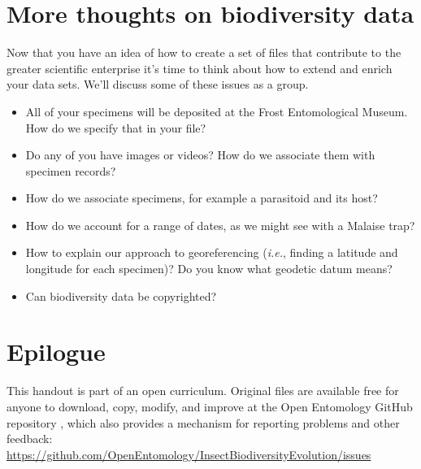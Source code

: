 \documentclass[11pt,letterpaper]{article}
\begin{document}
\section*{More thoughts on biodiversity data}
Now that you have an idea of how to create a set of files that contribute to the greater scientific enterprise it's time to think about how to extend and enrich your data sets. We'll discuss some of these issues as a group.
\begin{itemize}
\item All of your specimens will be deposited at the Frost Entomological Museum. How do we specify that in your file?
\item Do any of you have images or videos? How do we associate them with specimen records?
\item How do we associate specimens, for example a parasitoid and its host? 
\item How do we account for a range of dates, as we might see with a Malaise trap?
\item How to explain our approach to georeferencing (\textit{i.e.}, finding a latitude and longitude for each specimen)? Do you know what geodetic datum means?
\item Can biodiversity data be copyrighted?
\end{itemize}\vspace{2cm}

\section*{Epilogue}
This handout is part of an open curriculum. Original files are available free for anyone to download, copy, modify, and improve at the Open Entomology GitHub repository \citep{ENT432}, which also provides a mechanism for reporting problems and other feedback:\\
\url{https://github.com/OpenEntomology/InsectBiodiversityEvolution/issues}



\end{document}
